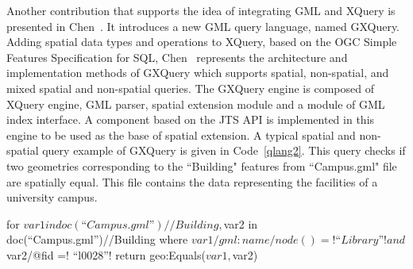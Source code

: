 \documentclass[a4paper,12pt]{article}
\begin{document}
\vspace{10px}
\vspace{10px}

Another contribution that supports the idea of integrating GML and XQuery is presented in Chen~\cite{Chen2010}.
It introduces a new GML query language, named GXQuery. 
Adding spatial data types and operations to XQuery, based on the OGC Simple Features Specification for SQL, 
Chen~\cite{Chen2010} represents the architecture and implementation methods of GXQuery 
which supports spatial, non-spatial, and mixed spatial and non-spatial queries. 
The GXQuery engine is composed of XQuery engine, GML parser, spatial extension module 
and a module of GML index interface. 
A component based on the JTS API is implemented in this engine
to be used as the base of spatial extension. 
A typical spatial and non-spatial query example of GXQuery is given in Code~\ref{qlang2}.
This query checks if two geometries corresponding to the ``Building" features from 
``Campus.gml" file are spatially equal. This file contains the data representing
the facilities of a university campus.
\vspace{10px}
\begin{fakeXML}[escapechar=\!,label=qlang2,caption=A typical example of combined spatial and non-spatial query in GXQuery.]
for $var1 in doc(“Campus.gml”)//Building,
    $var2 in doc(“Campus.gml”)//Building
where 
    $var1/gml:name/node()=! “Library”! and $var2/@fid =! “l0028”! 
return geo:Equals($var1, $var2)
\end{fakeXML}
\vspace{10px}
\end{document}
